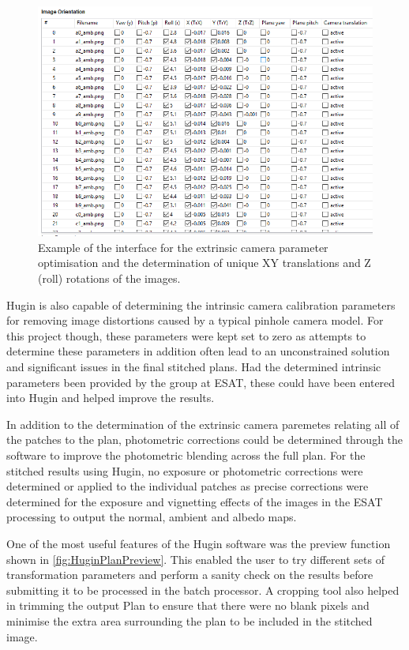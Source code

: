 	\begin{figure}[H]
		\centering
		\includegraphics[width=1\textwidth]{img/HuginOrientationParams.PNG}
		\caption{Example of the interface for the extrinsic camera parameter optimisation and the determination of unique XY translations and Z (roll) rotations of the images.}
		\label{fig:OrientationParams}
	\end{figure}
	
	Hugin is also capable of determining the intrinsic camera calibration parameters for removing image distortions caused by a typical pinhole camera model. For this project though, these parameters were kept set to zero as attempts to determine these parameters in addition often lead to an unconstrained solution and significant issues in the final stitched plans. Had the determined intrinsic parameters been provided by the group at ESAT, these could have been entered into Hugin and helped improve the results.
	
	In addition to the determination of the extrinsic camera paremetes relating all of the patches to the plan, photometric corrections could be determined through the software to improve the photometric blending across the full plan. For the stitched results using Hugin, no exposure or photometric corrections were determined or applied to the individual patches as precise corrections were determined for the exposure and vignetting effects of the images in the ESAT processing to output the normal, ambient and albedo maps.
	
	One of the most useful features of the Hugin software was the preview function shown in \cref{fig:HuginPlanPreview}. This enabled the user to try different sets of transformation parameters and perform a sanity check on the results before submitting it to be processed in the batch processor. A cropping tool also helped in trimming the output Plan to ensure that there were no blank pixels and minimise the extra area surrounding the plan to be included in the stitched image.
	
